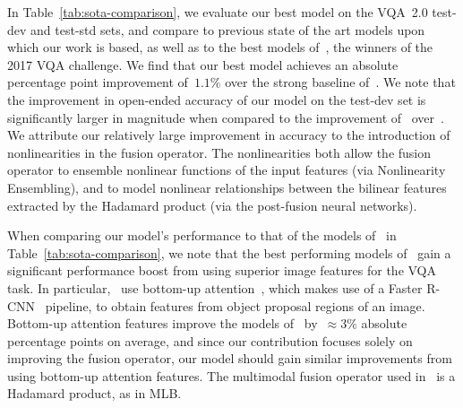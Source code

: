 In Table~\ref{tab:sota-comparison}, we evaluate our best model on the VQA~2.0
test-dev and test-std sets, and compare to previous state of the art models
upon which our work is based, as well as to the best models
of~\cite{teney2017tips}, the winners of the 2017 VQA challenge. We
find that our best model achieves an absolute percentage point improvement
of~$1.1\%$ over the strong baseline of~\cite{ben2017mutan}. We note that the
improvement in open-ended accuracy of our model on the test-dev set is
significantly larger in magnitude when compared to the improvement
of~\cite{ben2017mutan} over~\cite{fukui2016multimodalCB}. We attribute
our relatively large improvement in accuracy to the introduction of
nonlinearities in the fusion operator. The nonlinearities both allow the fusion
operator to ensemble nonlinear functions of the input features (via
Nonlinearity Ensembling), and to model nonlinear relationships between the
bilinear features extracted by the Hadamard product (via the post-fusion neural
networks).

When comparing our model's performance to that of the models
of~\cite{teney2017tips} in Table~\ref{tab:sota-comparison}, we note that the
best performing models of~\cite{teney2017tips} gain a significant performance
boost from using superior image features for the VQA task. In
particular,~\cite{teney2017tips} use bottom-up
attention~\cite{anderson2017bottom}, which makes use of a Faster
R-CNN~\cite{ren2015faster} pipeline, to obtain features from object proposal
regions of an image. Bottom-up attention features improve the models
of~\cite{teney2017tips} by~$\approx 3\%$ absolute percentage points on average,
and since our contribution focuses solely on improving the fusion operator, our
model should gain similar improvements from using bottom-up attention features.
The multimodal fusion operator used in~\cite{teney2017tips} is a Hadamard
product, as in MLB\@.

